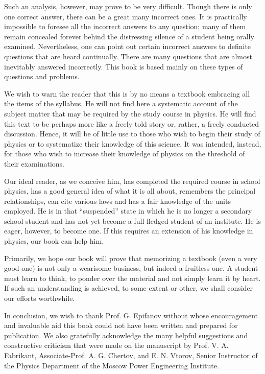 \documentclass[a4paper,sfsidenotes]{tufte-book}
\begin{document}
Such an analysis, however, may prove to be very difficult. Though there is only one correct answer, there can be a great many incorrect ones. It is practically impossible to foresee all the incorrect answers to any question; many of them remain concealed forever behind the distressing silence of a student being orally examined. Nevertheless, one can point out certain incorrect answers to definite questions that are heard continually. There are many questions that are almost inevitably answered incorrectly. This book is based mainly on these types of questions and problems.

We wish to warn the reader that this is by no means a textbook embracing all the items of the syllabus. He will not find here a systematic account of the subject matter that may be required by the study course in physics. He will find this text to be perhaps more like a freely told story or, rather, a freely conducted discussion. Hence, it will be of little use to those who wish to begin their study of physics or to systematize their knowledge of this science. It was intended, instead, for those who wish to increase their knowledge of physics on the threshold of their examinations.

Our ideal reader, as we conceive him, has completed the required course in school physics, has a good general idea of what it is all about, remembers the principal relationships, can cite various laws and has a fair knowledge of the units employed. He is in that ``suspended'' state in which he is no longer a secondary school student and has not yet become a full fledged student of an institute. He is eager, however, to become one. If this requires an extension of his knowledge in physics, our book can help him.

Primarily, we hope our book will prove that memorizing a textbook (even a very good one) is not only a wearisome business, but indeed a fruitless one. A student must learn to think, to ponder over the material and not simply learn it by heart. If such an understanding is achieved, to some extent or other, we shall consider our efforts worthwhile.

In conclusion, we wish to thank Prof. G. Epifanov without whose encouragement and invaluable aid this book could not have been written and prepared for publication. We also gratefully acknowledge the many helpful suggestions and constructive criticism that were made on the manuscript by Prof. V. A. Fabrikant, Associate-Prof. A. G. Chertov, and E. N. Vtorov, Senior Instructor of the Physics Department
of the Moscow Power Engineering Institute.
\end{document}
